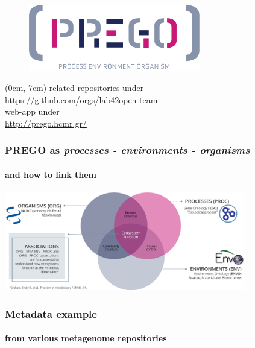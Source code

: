 \documentclass{beamer}
\begin{document}
   \begin{frame}
      
      \begin{figure}
         \includegraphics[width=75mm]{resources/prego_logo.png}
      \end{figure}

      \begin{textblock*}{12cm}(0cm, 7cm)
         \centering
         \small related repositories under \\
         \small \href{https://github.com/orgs/lab42open-team}{https://github.com/orgs/lab42open-team} \\ 
         \small web-app under\\
         \small \href{http://prego.hcmr.gr/}{http://prego.hcmr.gr/}
      \end{textblock*}

   \end{frame}

   \begin{frame}
      \frametitle{PREGO as \textit{processes - environments - organisms}}
      \framesubtitle{and how to link them}
      \includegraphics[width=105mm]{resources/prego_triple_associations.png}
   \end{frame}

   \begin{frame}

      \frametitle{Metadata example}
      \framesubtitle{from various metagenome repositories}
   \end{frame}
\end{document}
